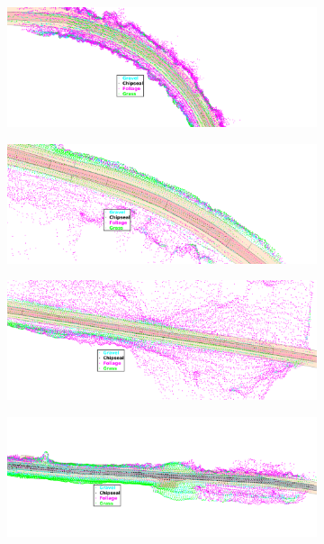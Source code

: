 \documentclass[journal,onecolumn]{IEEEtran}
\begin{document}
	\begin{figure}[H]
		\centering
		
		\begin{subfigure}{0.495\textwidth}
			\centering
			\includegraphics[width=0.95\linewidth]{figures/curve_gravel}
			\caption[]{}
			\label{fig:curve_gravel_2}	
		\end{subfigure}
		\begin{subfigure}{0.495\textwidth}
			\centering
			\includegraphics[width=0.95\linewidth]{figures/curve_gravel_2}
			\caption[]{}
			\label{fig:curve_gravel}
		\end{subfigure}
		\begin{subfigure}{0.495\textwidth}
			\centering
			\includegraphics[width=0.95\linewidth]{figures/long_gravel_1}
			\caption[]{}
			\label{fig:long_gravel_1}	
		\end{subfigure}
		\begin{subfigure}{0.495\textwidth}
			\centering
			\includegraphics[width=0.95\linewidth]{figures/long_chip_redux}

\end{subfigure}
\end{figure}
\end{document}
